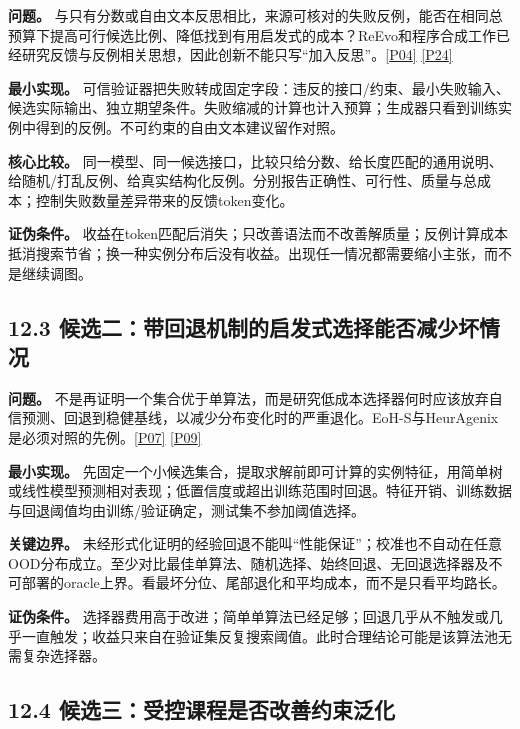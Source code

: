 \textbf{问题。}
与只有分数或自由文本反思相比，来源可核对的失败反例，能否在相同总预算下提高可行候选比例、降低找到有用启发式的成本？ReEvo和程序合成工作已经研究反馈与反例相关思想，因此创新不能只写``加入反思''。\href{https://proceedings.neurips.cc/paper_files/paper/2024/hash/4ced59d480e07d290b6f29fc8798f195-Abstract-Conference.html}{{[}P04{]}}
\href{https://arxiv.org/abs/2403.03997}{{[}P24{]}}

\textbf{最小实现。}
可信验证器把失败转成固定字段：违反的接口/约束、最小失败输入、候选实际输出、独立期望条件。失败缩减的计算也计入预算；生成器只看到训练实例中得到的反例。不可约束的自由文本建议留作对照。

\textbf{核心比较。}
同一模型、同一候选接口，比较只给分数、给长度匹配的通用说明、给随机/打乱反例、给真实结构化反例。分别报告正确性、可行性、质量与总成本；控制失败数量差异带来的反馈token变化。

\textbf{证伪条件。}
收益在token匹配后消失；只改善语法而不改善解质量；反例计算成本抵消搜索节省；换一种实例分布后没有收益。出现任一情况都需要缩小主张，而不是继续调图。

\subsection{12.3
候选二：带回退机制的启发式选择能否减少坏情况}\label{ux5019ux9009ux4e8cux5e26ux56deux9000ux673aux5236ux7684ux542fux53d1ux5f0fux9009ux62e9ux80fdux5426ux51cfux5c11ux574fux60c5ux51b5}

\textbf{问题。}
不是再证明一个集合优于单算法，而是研究低成本选择器何时应该放弃自信预测、回退到稳健基线，以减少分布变化时的严重退化。EoH-S与HeurAgenix是必须对照的先例。\href{https://ojs.aaai.org/index.php/AAAI/article/view/41038}{{[}P07{]}}
\href{https://arxiv.org/abs/2506.15196}{{[}P09{]}}

\textbf{最小实现。}
先固定一个小候选集合，提取求解前即可计算的实例特征，用简单树或线性模型预测相对表现；低置信度或超出训练范围时回退。特征开销、训练数据与回退阈值均由训练/验证确定，测试集不参加阈值选择。

\textbf{关键边界。}
未经形式化证明的经验回退不能叫``性能保证''；校准也不自动在任意OOD分布成立。至少对比最佳单算法、随机选择、始终回退、无回退选择器及不可部署的oracle上界。看最坏分位、尾部退化和平均成本，而不是只看平均路长。

\textbf{证伪条件。}
选择器费用高于改进；简单单算法已经足够；回退几乎从不触发或几乎一直触发；收益只来自在验证集反复搜索阈值。此时合理结论可能是该算法池无需复杂选择器。

\subsection{12.4
候选三：受控课程是否改善约束泛化}\label{ux5019ux9009ux4e09ux53d7ux63a7ux8bfeux7a0bux662fux5426ux6539ux5584ux7ea6ux675fux6cdbux5316}

